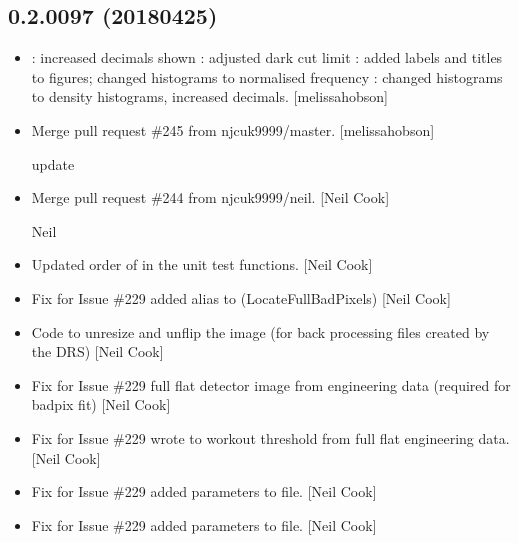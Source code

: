 \documentclass[a4paper,10pt,english]{report}
\begin{document}
\subsection{0.2.0097 (2018\sphinxhyphen{}04\sphinxhyphen{}25)}
\label{\detokenize{misc/changelog:id474}}\begin{itemize}
\item {} 
: increased decimals shown : adjusted
dark cut limit : added labels and titles to figures;
changed histograms to normalised frequency :
changed histograms to density histograms, increased decimals.
{[}melissa\sphinxhyphen{}hobson{]}

\item {} 
Merge pull request \#245 from njcuk9999/master. {[}melissa\sphinxhyphen{}hobson{]}

update

\item {} 
Merge pull request \#244 from njcuk9999/neil. {[}Neil Cook{]}

Neil

\item {} 
Updated order of  in the unit test functions. {[}Neil
Cook{]}

\item {} 
Fix for Issue \#229 \sphinxhyphen{} added alias to 
(LocateFullBadPixels) {[}Neil Cook{]}

\item {} 
Code to un\sphinxhyphen{}resize and un\sphinxhyphen{}flip the image (for back processing files
created by the DRS) {[}Neil Cook{]}

\item {} 
Fix for Issue \#229 \sphinxhyphen{} full flat detector image from engineering data
(required for badpix fit) {[}Neil Cook{]}

\item {} 
Fix for Issue \#229 \sphinxhyphen{} wrote  to workout threshold
from full flat engineering data. {[}Neil Cook{]}

\item {} 
Fix for Issue \#229 \sphinxhyphen{} added parameters to  file. {[}Neil
Cook{]}

\item {} 
Fix for Issue \#229 \sphinxhyphen{} added parameters to  file. {[}Neil
Cook{]}


\end{itemize}
\end{document}
